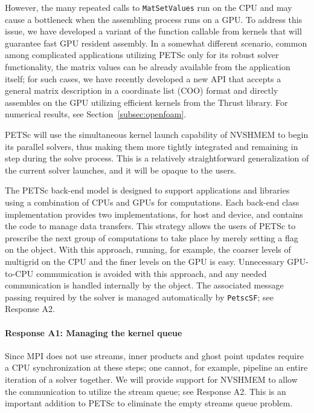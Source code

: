 \documentclass[10pt,journal,compsoc]{IEEEtran}
\begin{document}
However, the many repeated calls to {\tt MatSetValues} run on the CPU and may
cause a bottleneck when the assembling process runs on a GPU. To address this issue, we
have developed a variant of the function callable from kernels that
will guarantee fast GPU resident assembly. In a somewhat different scenario,
common among complicated applications  utilizing PETSc only for
its robust solver functionality, the matrix values can be already available from
the application itself; for such cases, we have recently developed a new API
that accepts a  general matrix description in a coordinate list (COO) format
and directly assembles on the GPU utilizing efficient kernels from the Thrust
library. %
For numerical results, see Section~\ref{subsec:openfoam}.


PETSc will use the simultaneous kernel launch capability of NVSHMEM
to begin its parallel solvers, thus making them more tightly integrated and remaining in step during
the solve process. This is a relatively straightforward generalization of the current solver
launches, and it will be opaque to the users.

The PETSc back-end model is designed to support applications and libraries
using a combination of CPUs and GPUs for computations. Each back-end class
implementation provides two implementations, for host and device, and contains
the code to manage data transfers. This strategy allows the users of PETSc to prescribe the next group of computations to take place by merely
setting a flag on the object.
With this approach, running, for example, the coarser levels of multigrid on the
CPU and the finer levels on the GPU is easy.
Unnecessary GPU-to-CPU communication is avoided with this approach, and any
needed communication is handled internally by the object. 
The
associated message passing required by the solver is managed automatically by
{\tt PetscSF}; see Response A2.

\paragraph{Response A1: Managing the kernel queue}


Since MPI does not use streams, 
inner products and ghost point updates require a CPU synchronization at these steps;  one cannot, for example, pipeline an entire iteration of a solver together. 
We will provide support for NVSHMEM to allow the communication to utilize the stream queue; see Response A2. This is an important addition to PETSc to eliminate the empty streams queue problem.
\end{document}
